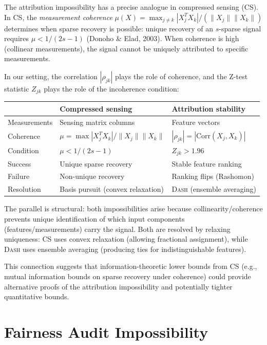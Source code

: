 \documentclass{article}
\newcommand{\DASH}{\textsc{Dash}}
\begin{document}
The attribution impossibility has a precise analogue in compressed
sensing (CS). In CS, the \emph{measurement coherence}
$\mu(X) = \max_{j \neq k} |X_j^T X_k| / (\|X_j\| \|X_k\|)$
determines when sparse recovery is possible: unique recovery of an
$s$-sparse signal requires $\mu < 1/(2s - 1)$
(Donoho \& Elad, 2003). When coherence is high (collinear
measurements), the signal cannot be uniquely attributed to specific
measurements.

In our setting, the correlation $|\rho_{jk}|$ plays the role of
coherence, and the Z-test statistic $Z_{jk}$ plays the role of the
incoherence condition:

\begin{center}
\small
\begin{tabular}{@{}lll@{}}
\toprule
& \textbf{Compressed sensing} & \textbf{Attribution stability} \\
\midrule
Measurements & Sensing matrix columns & Feature vectors \\
Coherence & $\mu = \max |X_j^T X_k|/\|X_j\|\|X_k\|$ & $|\rho_{jk}| = |\text{Corr}(X_j, X_k)|$ \\
Condition & $\mu < 1/(2s{-}1)$ & $Z_{jk} > 1.96$ \\
Success & Unique sparse recovery & Stable feature ranking \\
Failure & Non-unique recovery & Ranking flips (Rashomon) \\
Resolution & Basis pursuit (convex relaxation) & \DASH{} (ensemble averaging) \\
\bottomrule
\end{tabular}
\end{center}

The parallel is structural: both impossibilities arise because
collinearity/coherence prevents unique identification of which
input components (features/measurements) carry the signal. Both
are resolved by relaxing uniqueness: CS uses convex relaxation
(allowing fractional assignment), while \DASH{} uses ensemble
averaging (producing ties for indistinguishable features).

This connection suggests that information-theoretic lower bounds
from CS (e.g., mutual information bounds on sparse recovery under
coherence) could provide alternative proofs of the attribution
impossibility and potentially tighter quantitative bounds.

\section{Fairness Audit Impossibility}
\end{document}
